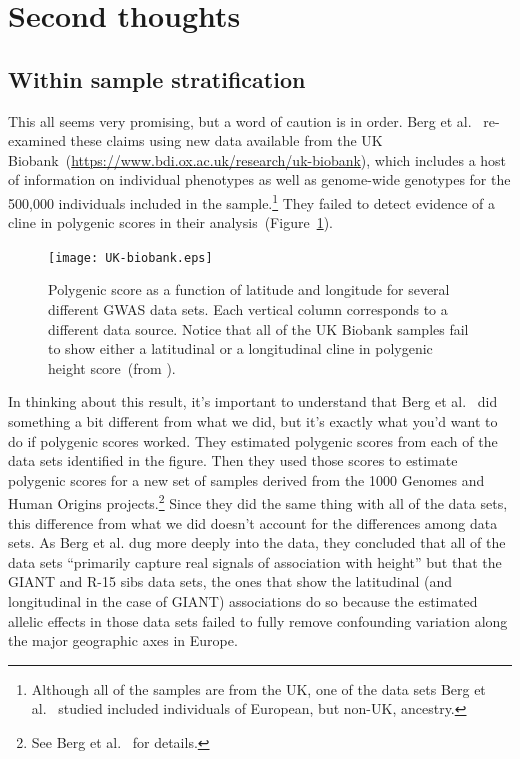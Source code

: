 \documentclass[12pt]{article}
\begin{document}
\section*{Second thoughts}

\subsection*{Within sample stratification}

This all seems very promising, but a word of caution is in order. Berg
et al.~\cite{Berg-etal-2018} re-examined these claims using new data
available from the UK
Biobank~(\url{https://www.bdi.ox.ac.uk/research/uk-biobank}), which
includes a host of information on individual phenotypes as well as
genome-wide genotypes for the 500,000 individuals included in the
sample.\footnote{Although all of the samples are from the UK, one of
  the data sets Berg et al.~\cite{Berg-etal-2018} studied included
  individuals of European, but non-UK, ancestry.} They failed to
detect evidence of a cline in polygenic scores in their
analysis~(Figure~\ref{fig:UK-biobank}).

\begin{figure}
  \begin{center}
    \texttt{[image: UK-biobank.eps]}
  \end{center}
  \caption{Polygenic score as a function of latitude and longitude for
    several different GWAS data sets. Each vertical column corresponds
  to a different data source. Notice that all of the UK Biobank
  samples fail to show either a latitudinal or a longitudinal cline in
  polygenic height score~(from \cite{Berg-etal-2018}).}\label{fig:UK-biobank} 
\end{figure}

In thinking about this result, it's important to understand that Berg
et al.~\cite{Berg-etal-2018} did something a bit different from what
we did, but it's exactly what you'd want to do if polygenic scores
worked. They estimated polygenic scores from each of the data sets
identified in the figure. Then they used those scores to estimate
polygenic scores for a new set of samples derived from the 1000
Genomes and Human Origins projects.\footnote{See Berg et
  al.~\cite{Berg-etal-2018} for details.} Since they did the same
thing with all of the data sets, this difference from what we did
doesn't account for the differences among data sets. As Berg et
al. dug more deeply into the data, they concluded that all of the data
sets ``primarily capture real signals of association with height'' but
that the GIANT and R-15 sibs data sets, the ones that show the
latitudinal (and longitudinal in the case of GIANT) associations do so
because the estimated allelic effects in those data sets failed to
fully remove confounding variation along the major geographic axes in
Europe.
\end{document}
